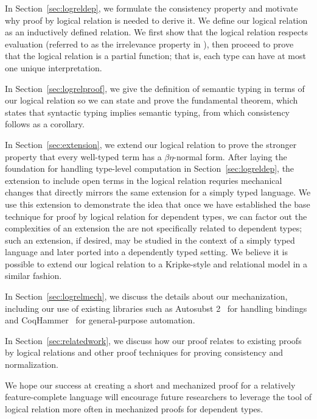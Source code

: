 \documentclass[acmsmall,screen=true,
\ifpublic review=false\else,review=true\fi
  ,anonymous=\ifanonymous true\else false\fi]{acmart}
\begin{document}
In Section~\ref{sec:logreldep}, we formulate the consistency property
and motivate why proof by logical relation is needed to derive it.
We define our logical relation as an inductively defined relation. We first
show that the logical relation respects evaluation (referred to as the
irrelevance property in \citet{martin-lof-a-la-coq}), then proceed to
prove that the logical relation is a partial function; that is, each
type can have at most one unique interpretation.

In Section~\ref{sec:logrelproof}, we give the definition of semantic
typing in terms of our logical relation so we can state and prove the
fundamental theorem, which states that syntactic typing implies
semantic typing, from which consistency follows as a corollary.

In Section~\ref{sec:extension}, we extend our logical relation to
prove the stronger property that every well-typed term has a
$\beta\eta$-normal form. After laying the foundation for handling
type-level computation in Section~\ref{sec:logreldep}, the extension
to include open terms in the logical relation requries mechanical
changes that directly mirrors the same extension for a simply typed
language. We use this extension to demonstrate the idea that once we
have established the base technique for proof by logical relation for
dependent types, we can factor out the complexities of an extension
the are not specifically related to dependent types; such an
extension, if desired, may be studied in the context of a simply typed
language and later ported into a dependently typed setting. We believe
it is possible to extend our logical relation to a Kripke-style and
relational model in a similar fashion.

In Section~\ref{sec:logrelmech}, we discuss the details about our
mechanization, including our use of existing libraries such as
Autosubst 2~\citep{autosubst2} for handling bindings and
CoqHammer~\citep{czajka2018hammer} for general-purpose automation.

In Section~\ref{sec:relatedwork}, we discuss how our proof relates to
existing proofs by logical relations and other proof techniques for
proving consistency and normalization.

We hope our success at creating a short and mechanized proof for a
relatively feature-complete language will encourage future researchers
to leverage the tool of logical relation more often in mechanized
proofs for dependent types.
\end{document}
